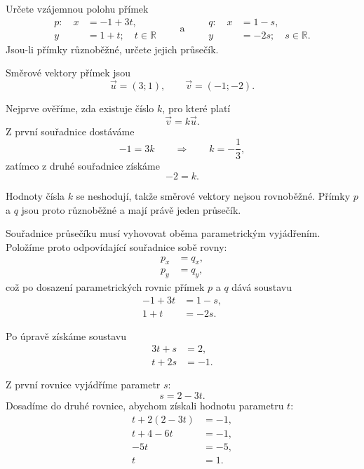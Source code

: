 \begin{example}\label{exa:Intersecting_parametric_lines}
    Určete vzájemnou polohu přímek
    \[
        \begin{aligned}
            p:\quad x &= -1+3t,\\
                     y &= 1+t;
                     \quad t\in\mathbb{R}
        \end{aligned}
        \qquad\text{a}\qquad
        \begin{aligned}
            q:\quad x &= 1-s,\\
                     y &= -2s;
                     \quad s\in\mathbb{R}.
        \end{aligned}
    \]
    Jsou-li přímky různoběžné, určete jejich průsečík.

    Směrové vektory přímek jsou
    \[
        \vec{u}=(3;1),
        \qquad
        \vec{v}=(-1;-2).
    \]

    Nejprve ověříme, zda existuje číslo $k$, pro které platí
    \[
        \vec{v}=k\vec{u}.
    \]
    Z první souřadnice dostáváme
    \[
        -1=3k
        \qquad\Rightarrow\qquad
        k=-\frac13,
    \]
    zatímco z druhé souřadnice získáme
    \[
        -2=k.
    \]

    Hodnoty čísla $k$ se neshodují, takže směrové vektory nejsou
    rovnoběžné. Přímky $p$ a $q$ jsou proto různoběžné a mají právě
    jeden průsečík.

    Souřadnice průsečíku musí vyhovovat oběma parametrickým vyjádřením.
    Položíme proto odpovídající souřadnice sobě rovny:
    \begin{align*}
        p_x &= q_x,\\
        p_y &= q_y,
    \end{align*}
    což po dosazení parametrických rovnic přímek $p$ a $q$ dává soustavu
    \begin{align*}
        -1+3t &= 1-s,\\
        1+t &= -2s.
    \end{align*}

    Po úpravě získáme soustavu
    \begin{align*}
        3t+s &= 2,\\
        t+2s &= -1.
    \end{align*}

    Z první rovnice vyjádříme parametr $s$:
    \[
        s=2-3t.
    \]
    Dosadíme do druhé rovnice, abychom získali hodnotu parametru $t$:
    \begin{align*}
        t+2(2-3t) &= -1,\\
        t+4-6t &= -1,\\
        -5t &= -5,\\
        t &= 1.
    \end{align*}


\end{example}
